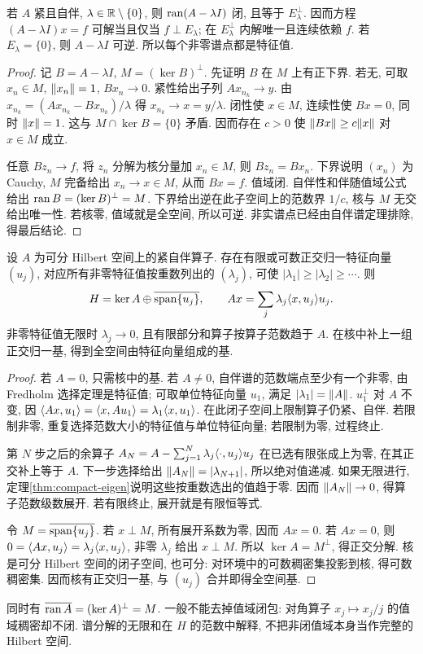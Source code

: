 \begin{theorem}\label{thm:fredholm}
若 $A$ 紧且自伴, $\lambda\in\mathbb R\setminus\{0\}$, 则 $\operatorname{ran}(A-\lambda I)$ 闭, 且等于 $E_\lambda^\perp$. 因而方程 $(A-\lambda I)x=f$ 可解当且仅当 $f\perp E_\lambda$; 在 $E_\lambda^\perp$ 内解唯一且连续依赖 $f$. 若 $E_\lambda=\{0\}$, 则 $A-\lambda I$ 可逆. 所以每个非零谱点都是特征值.
\end{theorem}
\begin{proof}
记 $B=A-\lambda I$, $M=(\ker B)^\perp$. 先证明 $B$ 在 $M$ 上有正下界. 若无, 可取 $x_n\in M$, $\lVert x_n\rVert=1$, $Bx_n\to0$. 紧性给出子列 $Ax_{n_k}\to y$. 由 $x_{n_k}=(Ax_{n_k}-Bx_{n_k})/\lambda$ 得 $x_{n_k}\to x=y/\lambda$. 闭性使 $x\in M$, 连续性使 $Bx=0$, 同时 $\lVert x\rVert=1$. 这与 $M\cap\ker B=\{0\}$ 矛盾. 因而存在 $c>0$ 使 $\lVert Bx\rVert\ge c\lVert x\rVert$ 对 $x\in M$ 成立.

任意 $Bz_n\to f$, 将 $z_n$ 分解为核分量加 $x_n\in M$, 则 $Bz_n=Bx_n$. 下界说明 $(x_n)$ 为 Cauchy, $M$ 完备给出 $x_n\to x\in M$, 从而 $Bx=f$. 值域闭. 自伴性和伴随值域公式给出 $\operatorname{ran} B=(\ker B)^\perp=M$. 下界给出逆在此子空间上的范数界 $1/c$, 核与 $M$ 无交给出唯一性. 若核零, 值域就是全空间, 所以可逆. 非实谱点已经由自伴谱定理排除, 得最后结论.
\end{proof}

\begin{theorem}[紧自伴谱定理]\label{thm:spectral}
设 $A$ 为可分 Hilbert 空间上的紧自伴算子. 存在有限或可数正交归一特征向量 $(u_j)$, 对应所有非零特征值按重数列出的 $(\lambda_j)$, 可使 $|\lambda_1|\ge|\lambda_2|\ge\cdots$. 则
\[
H=\ker A\oplus\overline{\operatorname{span}\{u_j\}},\qquad
Ax=\sum_j\lambda_j\langle x,u_j\rangle u_j.
\]
非零特征值无限时 $\lambda_j\to0$, 且有限部分和算子按算子范数趋于 $A$. 在核中补上一组正交归一基, 得到全空间由特征向量组成的基.
\end{theorem}
\begin{proof}
若 $A=0$, 只需核中的基. 若 $A\ne0$, 自伴谱的范数端点至少有一个非零, 由 Fredholm 选择定理是特征值; 可取单位特征向量 $u_1$, 满足 $|\lambda_1|=\lVert A\rVert$. $u_1^\perp$ 对 $A$ 不变, 因 $\langle Ax,u_1\rangle=\langle x,Au_1\rangle=\lambda_1\langle x,u_1\rangle$. 在此闭子空间上限制算子仍紧、自伴. 若限制非零, 重复选择范数大小的特征值与单位特征向量; 若限制为零, 过程终止.

第 $N$ 步之后的余算子
$A_N=A-\sum_{j=1}^N\lambda_j\langle \cdot,u_j\rangle u_j$
在已选有限张成上为零, 在其正交补上等于 $A$. 下一步选择给出 $\lVert A_N\rVert=|\lambda_{N+1}|$, 所以绝对值递减. 如果无限进行, 定理\ref{thm:compact-eigen}说明这些按重数选出的值趋于零. 因而 $\lVert A_N\rVert\to0$, 得算子范数级数展开. 若有限终止, 展开就是有限恒等式.

令 $M=\overline{\operatorname{span}\{u_j\}}$. 若 $x\perp M$, 所有展开系数为零, 因而 $Ax=0$. 若 $Ax=0$, 则 $0=\langle Ax,u_j\rangle=\lambda_j\langle x,u_j\rangle$, 非零 $\lambda_j$ 给出 $x\perp M$. 所以 $\ker A=M^\perp$, 得正交分解. 核是可分 Hilbert 空间的闭子空间, 也可分: 对环境中的可数稠密集投影到核, 得可数稠密集. 因而核有正交归一基, 与 $(u_j)$ 合并即得全空间基.
\end{proof}
同时有 $\overline{\operatorname{ran} A}=(\ker A)^\perp=M$. 一般不能去掉值域闭包: 对角算子 $x_j\mapsto x_j/j$ 的值域稠密却不闭. 谱分解的无限和在 $H$ 的范数中解释, 不把非闭值域本身当作完整的 Hilbert 空间.

